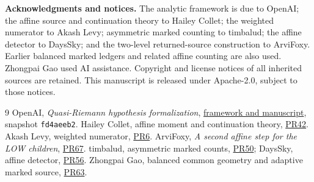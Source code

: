 \documentclass[10pt,a4paper]{article}
\begin{document}
\small\textbf{Acknowledgments and notices.}
The analytic framework is due to OpenAI; the affine source and continuation
theory to Hailey Collet; the weighted numerator to Akash Levy; asymmetric
marked counting to timbalud; the affine detector to DaysSky; and the two-level
returned-source construction to ArviFoxy. Earlier balanced marked ledgers
and related affine counting are also used. Zhongpai Gao used AI assistance.
Copyright and license notices of all inherited sources are retained.
This manuscript is released under Apache-2.0, subject to those notices.

\begin{thebibliography}{9}\footnotesize
{} OpenAI, \emph{Quasi-Riemann hypothesis formalization},
\href{https://github.com/openai/math/blob/fd4aeeb2ee4fc729c18d98444fed42fd0529eeeb/lean/docs/003.md}{framework and manuscript}, snapshot \texttt{fd4aeeb2}.
 Hailey Collet, affine moment and continuation theory,
\href{https://github.com/GTimG/QuasiRiemannTracker/pull/42}{PR42}.
 Akash Levy, weighted numerator,
\href{https://github.com/GTimG/QuasiRiemannTracker/pull/6}{PR6}.
 ArviFoxy, \emph{A second affine step for the LOW children},
\href{https://github.com/GTimG/QuasiRiemannTracker/pull/67}{PR67}.
 timbalud, asymmetric marked counts,
\href{https://github.com/GTimG/QuasiRiemannTracker/pull/50}{PR50}; DaysSky, affine detector,
\href{https://github.com/GTimG/QuasiRiemannTracker/pull/56}{PR56}.
 Zhongpai Gao, balanced common geometry and adaptive marked source,
\href{https://github.com/GTimG/QuasiRiemannTracker/pull/63}{PR63}.
\end{thebibliography}
\end{document}
